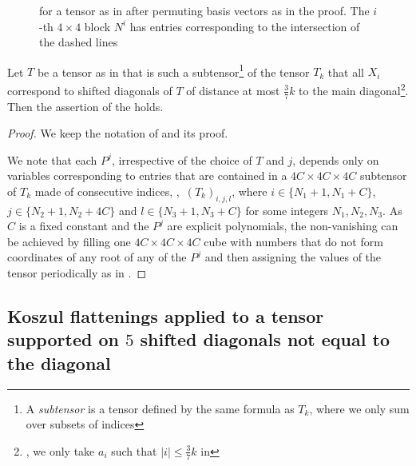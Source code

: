 \documentclass{toc}
\begin{document}
\begin{figure}[ht]
\begin{center}
\caption{ for a tensor as in   after permuting basis vectors as in the proof. The $i$-th $4\times 4$ block $N^i$ has entries corresponding to the intersection of the dashed lines}\label{fig:4x4}
\end{center}
\end{figure}
\begin{corollary}\label{cor:subTkclosediag}
Let $T$ be a tensor as in 
that is such a subtensor\footnote{%
%
A \emph{subtensor} is %
a tensor defined by the same formula as $T_k$, where we only sum over subsets of indices} of the tensor $T_k$ that all  $X_i$ correspond to 
%
shifted 
diagonals of $T$ of distance at most $\frac{3}{7}k$ to the main
%
diagonal\footnote{\Ie, we only %
take $a_i$ such that $|i|\leq \frac{3}{7}k$ in }. Then the assertion of the  holds.
\end{corollary}
\begin{proof}
We keep the notation of  and its proof.

We note that each $P^j$, irrespective of the choice of $T$ and $j$, depends only on variables corresponding to entries that are contained in a $4C\times 4C\times 4C$ subtensor of $T_k$  made of consecutive indices, \ie,~$(T_{k})_{i,j,l}$, where $i\in \{N_1+1,N_1+C\}$, $j\in \{N_2+1,N_2+4C\}$ and $l\in \{N_3+1,N_3+C\}$ for some integers $N_1,N_2,N_3$. As $C$ is a fixed constant and
the  %
$P^j$ are explicit polynomials, the non-vanishing can be achieved by filling
one $4C\times 4C\times 4C$ cube with numbers 
%
that do not form coordinates of any root of 
%
%
%
 any of the $P^j$   %
%
%
and then assigning the values of the tensor periodically as in .
\end{proof}

%

\subsection{Koszul flattenings applied to  a tensor supported on $5$ 
%
shifted
diagonals not equal to the diagonal}
\end{document}
